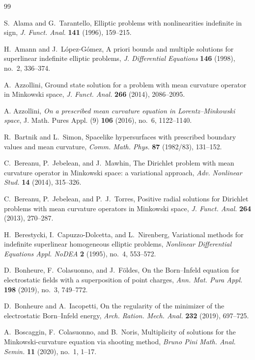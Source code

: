 \documentclass[11pt,reqno]{amsart}
\theoremstyle{plain}
\theoremstyle{definition}
\numberwithin{equation}{section}
\begin{document}
\begin{thebibliography}{99}

S.~Alama and G.~Tarantello,
Elliptic problems with nonlinearities indefinite in sign,
\emph{J. Funct. Anal.} \textbf{141} (1996), 159--215.

H.~Amann and J.~López-Gómez,
A priori bounds and multiple solutions for superlinear indefinite elliptic problems,
\emph{J. Differential Equations} \textbf{146} (1998), no.~2, 336--374.

A.~Azzollini,
Ground state solution for a problem with mean curvature operator in Minkowski space,
\emph{J. Funct. Anal.} \textbf{266} (2014), 2086--2095.

A. Azzollini,
\emph{On a prescribed mean curvature equation in Lorentz--Minkowski space},
J. Math. Pures Appl. (9) \textbf{106} (2016), no.~6, 1122--1140.

R.~Bartnik and L.~Simon,
Spacelike hypersurfaces with prescribed boundary values and mean curvature,
\emph{Comm. Math. Phys.} \textbf{87} (1982/83), 131--152.

C.~Bereanu, P.~Jebelean, and J.~Mawhin,
The Dirichlet problem with mean curvature operator in Minkowski space: a variational approach,
\emph{Adv. Nonlinear Stud.} \textbf{14} (2014), 315--326.

C.~Bereanu, P.~Jebelean, and P.~J.~Torres,
Positive radial solutions for Dirichlet problems with mean curvature operators in Minkowski space,
\emph{J. Funct. Anal.} \textbf{264} (2013), 270--287.

H.~Berestycki, I.~Capuzzo-Dolcetta, and L.~Nirenberg,
Variational methods for indefinite superlinear homogeneous elliptic problems,
\emph{Nonlinear Differential Equations Appl. NoDEA} \textbf{2} (1995), no.~4, 553--572.

D.~Bonheure, F.~Colasuonno, and J.~F\"oldes,
On the Born--Infeld equation for electrostatic fields with a superposition of point charges,
\emph{Ann. Mat. Pura Appl.} \textbf{198} (2019), no.~3, 749--772.

D.~Bonheure and A.~Iacopetti,
On the regularity of the minimizer of the electrostatic Born--Infeld energy,
\emph{Arch. Ration. Mech. Anal.} \textbf{232} (2019), 697--725.

A.~Boscaggin, F.~Colasuonno, and B.~Noris,
Multiplicity of solutions for the Minkowski-curvature equation via shooting method,
\emph{Bruno Pini Math. Anal. Semin.} \textbf{11} (2020), no.~1, 1--17.


\end{thebibliography}
\end{document}
